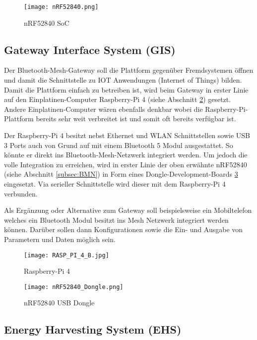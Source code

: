 \begin{figure}[h]
	\centering
	\texttt{[image: nRF52840.png]}
	\caption{nRF52840 SoC \cite{nordic_semiconductor_nrf52840-qiaa.png_2019}}
	\label{img:nRF52840}
\end{figure} 

\subsection{Gateway Interface System (GIS)}\label{subsec:Gateway}
Der Bluetooth-Mesh-Gateway soll die Plattform gegenüber Fremdsystemen öffnen und damit die Schnittstelle zu IOT Anwendungen (Internet of Things) bilden. Damit die Plattform einfach zu betreiben ist, wird beim Gateway in erster Linie auf den Einplatinen-Computer Raspberry-Pi 4 (siehe Abschnitt \ref{img:raspberryPi4}) gesetzt. Andere Einplatinen-Computer wären ebenfalls denkbar wobei die Raspberry-Pi-Plattform bereits sehr weit verbreitet ist und somit oft bereits verfügbar ist.

Der Raspberry-Pi 4 besitzt nebst Ethernet und WLAN Schnittstellen sowie USB 3 Ports auch von Grund auf mit einem Bluetooth 5 Modul ausgestattet. So könnte er direkt ins Bluetooth-Mesh-Netzwerk integriert werden. Um jedoch die volle Integration zu erreichen, wird in erster Linie der oben erwähnte nRF52840 (siehe Abschnitt \ref{subsec:BMN}) in Form eines Dongle-Development-Boards \ref{img:nRF52840USBDongle} eingesetzt. Via serieller Schnittstelle wird dieser mit dem Raspberry-Pi 4 verbunden.

Als Ergänzung oder Alternative zum Gateway soll beispielsweise ein Mobiltelefon welches ein Bluetooth Modul besitzt ins Mesh Netzwerk integriert werden können. Darüber sollen dann Konfigurationen sowie die Ein- und Ausgabe von Parametern und Daten möglich sein. 


\begin{figure}[h]
	\centering
	\texttt{[image: RASP\_PI\_4\_B.jpg]}
	\caption{Raspberry-Pi 4 \cite{reichelt_elektronik_gmbh_&_co_kg_rasp_nodate}}
	\label{img:raspberryPi4}
\end{figure} 

\begin{figure}[h]
	\centering
	\texttt{[image: nRF52840\_Dongle.png]}
	\caption{nRF52840 USB Dongle \cite{nordic_semiconductor_nrf52840-dongle-promo.png_2019}}
	\label{img:nRF52840USBDongle}
\end{figure} 


\subsection{Energy Harvesting System (EHS)}\label{subsec:EHS}

